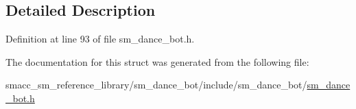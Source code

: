 \subsection{Detailed Description}


Definition at line 93 of file sm\+\_\+dance\+\_\+bot.\+h.



The documentation for this struct was generated from the following file\+:\begin{DoxyCompactItemize}
\item 
smacc\+\_\+sm\+\_\+reference\+\_\+library/sm\+\_\+dance\+\_\+bot/include/sm\+\_\+dance\+\_\+bot/\hyperlink{sm__dance__bot_8h}{sm\+\_\+dance\+\_\+bot.\+h}\end{DoxyCompactItemize}
